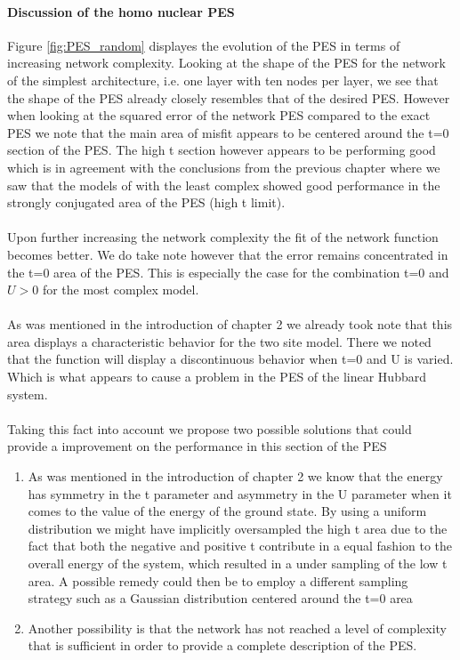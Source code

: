 \documentclass[12pt]{article}
\begin{document}
\paragraph{Discussion of the homo nuclear PES}
Figure \ref{fig:PES_random} displayes the evolution of the PES in terms of increasing network complexity. Looking at the shape of the PES for the network of the simplest architecture, i.e. one layer with ten nodes per layer, we see that the shape of the PES already closely resembles that of the desired PES. However when looking at the squared error of the network PES compared to the exact PES we note that the main area of misfit appears to be centered around the t=0 section of the PES. The high t section however appears to be performing good which is in agreement with the conclusions from the previous chapter where we saw that the models of with the least complex showed good performance in the strongly conjugated area of the PES (high t limit).
\\
\\
Upon further increasing the network complexity the fit of the network function becomes better. We do take note however that the error remains concentrated in the t=0 area of the PES. This is especially the case for the combination t=0 and $U>0$ for the most complex model.
\\
\\
As was mentioned in the introduction of chapter 2 we already took note that this area displays a characteristic behavior for the two site model. There we noted that the function will display a discontinuous behavior when t=0 and U is varied. Which is what appears to cause a problem in the PES of the linear Hubbard system.
\\
\\
Taking this fact into account we propose two possible solutions that could provide a improvement on the performance in this section of the PES
\begin{enumerate}
	\item As was mentioned in the introduction of chapter 2 we know that the energy has symmetry in the t parameter and asymmetry in the U parameter when it comes to the value of the energy of the ground state. By using a uniform distribution we might have implicitly oversampled the high t area due to the fact that both the negative and positive t contribute in a equal fashion to the overall energy of the system, which resulted in a under sampling of the low t area. A possible remedy could then be to employ a different sampling strategy such as a Gaussian distribution centered around the t=0 area
	\item Another possibility is that the network has not reached a level of complexity that is sufficient in order to provide a complete description of the PES. 
\end{enumerate}
\end{document}
